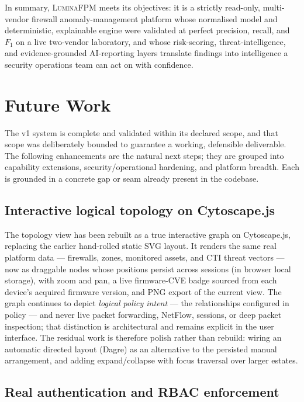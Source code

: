 \documentclass[12pt,a4paper]{report}
\renewcommand{\_}{\textunderscore\allowbreak}
\begin{document}
In summary, \textsc{LuminaFPM} meets its objectives: it is a strictly read-only, multi-vendor firewall anomaly-management platform whose normalised model and deterministic, explainable engine were validated at perfect precision, recall, and $F_1$ on a live two-vendor laboratory, and whose risk-scoring, threat-intelligence, and evidence-grounded AI-reporting layers translate findings into intelligence a security operations team can act on with confidence.

\section{Future Work}
\label{sec:ch5-future}

The v1 system is complete and validated within its declared scope, and that scope was deliberately bounded to guarantee a working, defensible deliverable. The following enhancements are the natural next steps; they are grouped into capability extensions, security/operational hardening, and platform breadth. Each is grounded in a concrete gap or seam already present in the codebase.

\subsection{Interactive logical topology on Cytoscape.js}
\label{sec:ch5-cytoscape}

The topology view has been rebuilt as a true interactive graph on Cytoscape.js, replacing the earlier hand-rolled static SVG layout. It renders the same real platform data --- firewalls, zones, monitored assets, and CTI threat vectors --- now as draggable nodes whose positions persist across sessions (in browser local storage), with zoom and pan, a live firmware-CVE badge sourced from each device's acquired firmware version, and PNG export of the current view. The graph continues to depict \emph{logical policy intent} --- the relationships configured in policy --- and never live packet forwarding, NetFlow, sessions, or deep packet inspection; that distinction is architectural and remains explicit in the user interface. The residual work is therefore polish rather than rebuild: wiring an automatic directed layout (Dagre) as an alternative to the persisted manual arrangement, and adding expand/collapse with focus traversal over larger estates.

\subsection{Real authentication and RBAC enforcement}
\label{sec:ch5-rbac}
\end{document}

